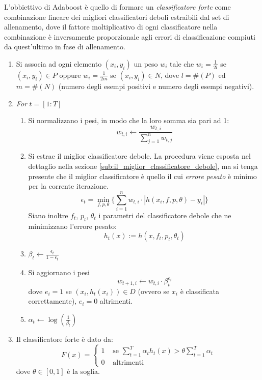 \documentclass[a4paper,11pt,oneside]{article}
\begin{document}
			L'obbiettivo di Adaboost è quello di formare un \emph{classificatore forte} come combinazione lineare dei migliori classificatori deboli estraibili dal set di allenamento, dove il fattore moltiplicativo di ogni classificatore nella combinazione è inversamente proporzionale agli errori di classificazione compiuti da quest'ultimo in fase di allenamento.

			\begin{enumerate}
				\item Si associa ad ogni elemento $(x_i, y_i)$ un peso $w_i$ tale che $w_i = \frac{1}{2l}$ se $(x_i, y_i) \in P$ oppure $w_i = \frac{1}{2m}$ se $(x_i, y_i) \in N$, dove $l = \#(P)$ ed $m = \#(N)$ (numero degli esempi positivi e numero degli esempi negativi).

				\item \emph{For} $t = [1:T]$
					\begin{enumerate}
						\item Si normalizzano i pesi, in modo che la loro somma sia pari ad 1:
						$$ w_{t,i} \leftarrow \frac{w_{t,i}}{\sum_{j = 1}^{n}w_{t,j}}$$

						\item \label{adaboost_minimum_error}
						Si estrae il miglior classificatore debole. La procedura viene esposta nel dettaglio nella sezione \ref{sub:il_miglior_classificatore_debole}, ma si tenga presente che il miglior classificatore è quello il cui \emph{errore pesato} è minimo per la corrente iterazione.
						$$ \epsilon_t = \min_{f,p,\theta} \{
							\sum_{i = 1}^{n} w_{t,i} \cdot |h(x_i, f, p, \theta) - y_i|
						\} $$
						Siano inoltre $f_t$, $p_t$, $\theta_t$ i parametri del classificatore debole che ne minimizzano l'errore pesato:
						$$ h_t(x) := h(x, f_t, p_t, \theta_t) $$

						\item \label{adaboost_beta} $\beta_t \leftarrow \frac{\epsilon_t}{1 - \epsilon_t}$

						\item \label{adaboost_update_weights} Si aggiornano i pesi
						$$ w_{t+1, i} \leftarrow w_{t,i} \cdot \beta_{t}^{e_i} $$
						dove $e_i = 1$ se $(x_i, h_t(x_i)) \in D$ (ovvero se $x_i$ è classificata correttamente), $e_i = 0$ altrimenti.

						\item $\alpha_t \leftarrow \log(\frac{1}{\beta_t})$
					\end{enumerate}

				\item \label{adaboost_strong_classifier} Il classificatore forte è dato da:
				\begin{equation}
					F(x) = \begin{cases}
						1 & \text{ se } \sum_{t = 1}^{T} \alpha_t h_t(x) > \theta \sum_{t = 1}^{T} \alpha_t \\
						0 & \text{ altrimenti }
					\end{cases}
				\end{equation}
				dove $\theta \in [0,1]$ è la soglia.
			\end{enumerate}
\end{document}
